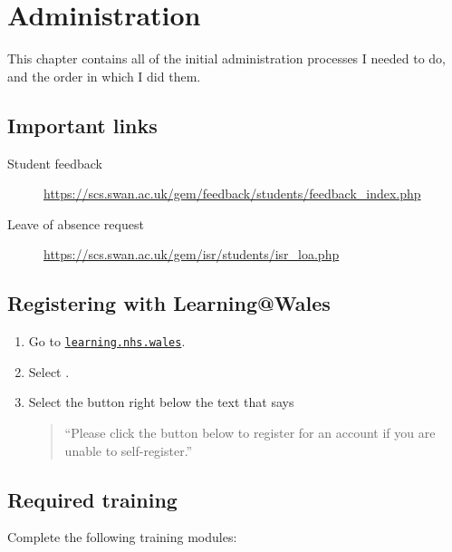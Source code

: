 \chapter{Administration}
\label{ch:administration}

This chapter contains all of the initial administration processes I needed to do, and the order in which I did them.

\section{Important links}
\label{sec:important-links}

\begin{description}
    \item[Student feedback]
        \url{https://scs.swan.ac.uk/gem/feedback/students/feedback_index.php}

    \item[Leave of absence request]
        \url{https://scs.swan.ac.uk/gem/isr/students/isr_loa.php}
\end{description}



\section{Registering with Learning@Wales}

\begin{enumerate}
    \item Go to
    \href{https://learning.nhs.wales/}{\texttt{learning.nhs.wales}}.

    \item Select .

    \item Select the button right below the text that says

    \begin{quote}
        \enquote{Please click the button below to register for an
        account if you are unable to self-register.}
    \end{quote}
\end{enumerate}

\section{Required training}

Complete the following training modules:

